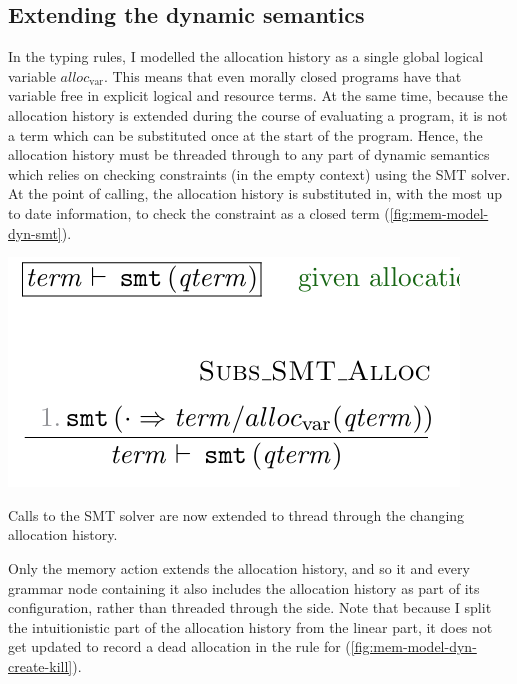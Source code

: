 \subsection{Extending the dynamic semantics}

In the typing rules, I modelled the allocation history as a single global
logical variable $\mathit{alloc}_\mathrm{var}$. This means that even morally
closed programs have that variable free in explicit logical and resource terms.
At the same time, because the allocation history is extended during the course
of evaluating a  program, it is not a term which can be substituted
once at the start of the program. Hence, the allocation history must
be threaded through to any part of dynamic semantics which relies on checking
constraints (in the empty context) using the SMT solver. At the point of
calling, the allocation history is substituted in, with the most up to date
information, to check the constraint as a closed term (\cref{fig:mem-model-dyn-smt}).

\begin{marginfigure}
    \includegraphics{figures/mem-model-dyn-smt}
    \caption{Calls to the SMT solver are now extended to thread through the
        changing allocation history.}\label{fig:mem-model-dyn-smt}
\end{marginfigure}

Only the  memory action extends the allocation history, and
so it and every grammar node containing it also includes the allocation history
as part of its configuration, rather than threaded through the
side. Note that
because I split the intuitionistic part of the allocation history from the
linear part, it does not get updated to record a dead allocation in the
rule for  (\cref{fig:mem-model-dyn-create-kill}).

